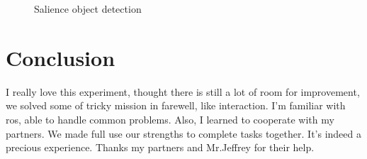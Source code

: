 \documentclass[UTF8]{article}
\begin{document}
  \begin{figure}
    \centering
    \caption{Salience object detection}
    \label{img_3}
  \end{figure}


\section{Conclusion}
    I really love this experiment, thought there is still a lot of room for improvement, we solved some of tricky mission in farewell, like interaction. I'm familiar with ros, able to handle common problems. Also, I learned to cooperate with my partners. We made full use our strengths to complete tasks together. It's indeed a precious experience. Thanks my partners and Mr.Jeffrey for their help.
\end{document}
